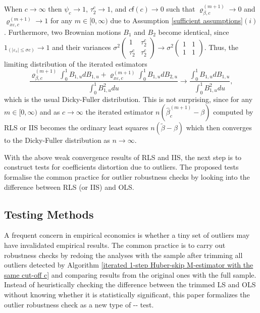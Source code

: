 \documentclass[11pt, letterpaper]{article}
\numberwithin{algorithm}{section}
\numberwithin{assumption}{section}
\numberwithin{lemma}{section}
\numberwithin{theorem}{section}
\numberwithin{corollary}{section}
\numberwithin{remark}{section}
\numberwithin{equation}{section}
\numberwithin{figure}{section}
\numberwithin{table}{section}
\begin{document}
When $c \to \infty$ then $\psi_{c} \to 1$, $\tau_{2}^{c} \to 1$, and $c \mathsf{f}(c) \to 0$ such that $\varrho_{\beta, c}^{(m + 1)} \to 0$ and $\varrho_{x \varepsilon, c}^{(m + 1)} \to 1$ for any $m \in [0, \infty)$ due to Assumption \ref{sufficient assumptions}$(i)$. Furthermore, two Brownian motions $B_{1}$ and $B_{2}$ become identical, since $1_{(|\varepsilon_{s}| \le \sigma c)} \to 1$ and their variances
$
\sigma^{2}
\begin{pmatrix}
1 & \tau_{2}^{c} \\
\tau_{2}^{c} & \tau_{2}^{c}
\end{pmatrix}
\to
\sigma^{2}
\begin{pmatrix}
1 & 1 \\
1 & 1
\end{pmatrix}
$.
Thus, the limiting distribution of the iterated estimators
\begin{equation*}
\frac{\varrho_{\beta, c}^{(m + 1)} \int_{0}^{1} B_{1, u} dB_{1, u} + \varrho_{x \varepsilon, c}^{(m + 1)} \int_{0}^{1} B_{1, u} dB_{2, u}}{\int_{0}^{1} B_{1, u}^{2} du}
\to
\frac{\int_{0}^{1} B_{1, u} dB_{1, u}}{\int_{0}^{1} B_{1, u}^{2} du},
\end{equation*}
which is the usual Dicky-Fuller distribution. This is not surprising, since for any $m \in [0, \infty)$ and as $c \to \infty$ the iterated estimator $n (\widehat{\beta}_{c}^{(m + 1)} - \beta)$ computed by RLS or IIS becomes the ordinary least squares $n (\widetilde{\beta} - \beta)$ which then converges to the Dicky-Fuller distribution as $n \to \infty$.

With the above weak convergence results of RLS and IIS, the next step is to construct tests for coefficients distortion due to outliers. The proposed tests formalise the common practice for outlier robustness checks by looking into the difference between RLS (or IIS) and OLS.


\subsection{Testing Methods} \label{sec_outlier distortion test}
A frequent concern in empirical economics is whether a tiny set of outliers may have invalidated empirical results. The common practice is to carry out robustness checks by redoing the analyses with the sample after trimming all outliers detected by Algorithm \ref{iterated 1-step Huber-skip M-estimator with the same cut-off c} and comparing results from the original ones with the full sample. Instead of heuristically checking the difference between the trimmed LS and OLS without knowing whether it is statistically significant, this paper formalizes the outlier robustness check as a new type of \cite{durbin1954errors}-\cite{hausman1978specification}-\cite{wu1973alternative} test.
\end{document}
